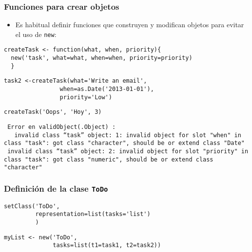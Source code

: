 \documentclass[xcolor={usenames,svgnames,dvipsnames}]{beamer}
\begin{document}
\begin{frame}[fragile]
\frametitle{Funciones para crear objetos}
\label{sec-3-1-4}

\begin{itemize}
\item Es habitual definir funciones que construyen y modifican objetos
  para evitar el uso de \texttt{new}:
\end{itemize}

\lstset{language=R}
\begin{lstlisting}
createTask <- function(what, when, priority){
  new('task', what=what, when=when, priority=priority)
  }
\end{lstlisting}



\lstset{language=R}
\begin{lstlisting}
task2 <-createTask(what='Write an email',
                when=as.Date('2013-01-01'),
                priority='Low')
\end{lstlisting}



\lstset{language=R}
\begin{lstlisting}
createTask('Oops', 'Hoy', 3)
\end{lstlisting}

\begin{verbatim}
 Error en validObject(.Object) : 
   invalid class “task” object: 1: invalid object for slot "when" in class "task": got class "character", should be or extend class "Date"
 invalid class “task” object: 2: invalid object for slot "priority" in class "task": got class "numeric", should be or extend class "character"
\end{verbatim}
\end{frame}
\begin{frame}[fragile]
\frametitle{Definición de la clase \texttt{ToDo}}
\label{sec-3-1-5}


\lstset{language=R}
\begin{lstlisting}
setClass('ToDo',
         representation=list(tasks='list')
         )
\end{lstlisting}



\lstset{language=R}
\begin{lstlisting}
myList <- new('ToDo',
              tasks=list(t1=task1, t2=task2))
\end{lstlisting}
\end{frame}
\end{document}

